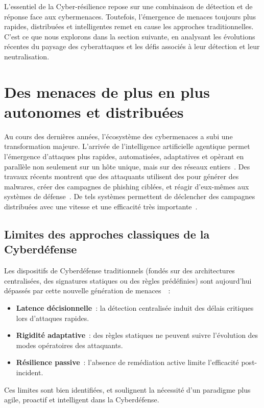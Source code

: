 \noindent
L'essentiel de la Cyber-résilience repose sur une combinaison de détection  et de réponse face aux cybermenaces. Toutefois, l'émergence de menaces toujours plus rapides, distribuées et intelligentes remet en cause les approches traditionnelles. C'est ce que nous explorons dans la section suivante, en analysant les évolutions récentes du paysage des cyberattaques et les défis associés à leur détection et leur neutralisation.


\section{Des menaces de plus en plus autonomes et distribuées}\label{sec:evolution-menaces}

Au cours des dernières années, l'écosystème des cybermenaces a subi une transformation majeure. L'arrivée de l'intelligence artificielle agentique permet l'émergence d'attaques plus rapides, automatisées, adaptatives et opèrant en parallèle non seulement sur un hôte unique, mais sur des réseaux entiers~\cite{Cohen2020}. Des travaux récents montrent que des attaquants utilisent des  pour générer des malwares, créer des campagnes de phishing ciblées, et réagir d'eux-mêmes aux systèmes de défense~\cite{AutoAttacker2024}. De tels systèmes permettent de déclencher des campagnes distribuées avec une vitesse et une efficacité très importante~\cite{AgenticAIThreats2025}.

\subsection*{Limites des approches classiques de la Cyberdéfense}

Les dispositifs de Cyberdéfense traditionnels (fondés sur des architectures centralisées, des signatures statiques ou des règles prédéfinies) sont aujourd'hui dépassés par cette nouvelle génération de menaces~\cite{Kott2023}~:
\begin{itemize}
    \item \textbf{Latence décisionnelle}~: la détection centralisée induit des délais critiques lors d'attaques rapides.
    \item \textbf{Rigidité adaptative}~: des règles statiques ne peuvent suivre l'évolution des modes opératoires des attaquants.
    \item \textbf{Résilience passive}~: l'absence de remédiation active limite l'efficacité post-incident.
\end{itemize}
Ces limites sont bien identifiées, et soulignent la nécessité d'un paradigme plus agile, proactif et intelligent dans la Cyberdéfense.

